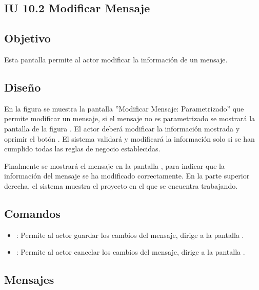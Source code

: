 \subsection{IU 10.2 Modificar Mensaje}

\subsection{Objetivo}
	Esta pantalla permite al actor modificar la información de un mensaje.
\subsection{Diseño}
	En la figura  se muestra la pantalla ''Modificar Mensaje: Parametrizado'' que permite modificar un mensaje, si el mensaje no es parametrizado se mostrará la pantalla de la figura . El actor deberá modificar la información mostrada y oprimir el botón  . El sistema validará y modificará la información solo si se han cumplido todas las reglas de negocio establecidas.
	
	Finalmente se mostrará el mensaje  en la pantalla , para indicar que la información del mensaje se ha modificado correctamente.
	En la parte superior derecha, el sistema muestra el proyecto en el que se encuentra trabajando.

\subsection{Comandos}
\begin{itemize}
	\item {}: Permite al actor guardar los cambios del mensaje, dirige a la pantalla .
	\item {}: Permite al actor cancelar los cambios del mensaje, dirige a la pantalla .
\end{itemize}

\subsection{Mensajes}

